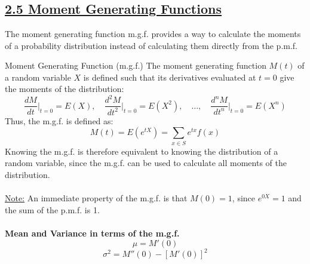 ﻿\documentclass[12pt]{article}
\begin{document}
\section*{}
\subsection*{\underline{2.5 Moment Generating Functions}}
The moment generating function m.g.f. provides a way to calculate the moments of a probability distribution instead of calculating them directly from the p.m.f.
\begin{definition}{Moment Generating Function (m.g.f.)}
    The moment generating function $M(t)$ of a random variable $X$ is defined such that its derivatives evaluated at $t=0$ give the moments of the distribution:
    \[\frac{dM}{dt}\bigg|_{t=0} = E(X),\quad \frac{d^2M}{dt^2}\bigg|_{t=0} = E(X^2),\quad \ldots,\quad \frac{d^nM}{dt^n}\bigg|_{t=0} = E(X^n)\]
    Thus, the m.g.f. is defined as:
    \[\boxed{M(t)=E(e^{tX})=\sum_{x\in S}e^{tx}f(x)}\]
    Knowing the m.g.f. is therefore equivalent to knowing the distribution of a random variable, since the m.g.f. can be used to calculate all moments of the distribution.\\\\
    \underline{Note:} An immediate property of the m.g.f. is that $M(0)=1$, since $e^{0X}=1$ and the sum of the p.m.f. is 1.\\\\
    \textbf{Mean and Variance in terms of the m.g.f.}
    \[
\boxed{\mu=M'(0)}
\]
\[
\boxed{\sigma^2=M''(0)-[M'(0)]^2}
\]
\end{definition}
\end{document}

